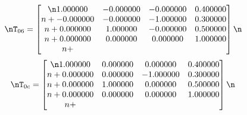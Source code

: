 \begin{equation*}\nT_{06} = \begin{bmatrix}\n1.000000 & -0.000000 & -0.000000 & 0.400000 \\n+-0.000000 & -0.000000 & -1.000000 & 0.300000 \\n+0.000000 & 1.000000 & -0.000000 & 0.500000 \\n+0.000000 & 0.000000 & 0.000000 & 1.000000 \\n+\end{bmatrix}\n\end{equation*}\n\n\begin{equation*}\nT_{0c} = \begin{bmatrix}\n1.000000 & 0.000000 & 0.000000 & 0.400000 \\n+0.000000 & 0.000000 & -1.000000 & 0.300000 \\n+0.000000 & 1.000000 & 0.000000 & 0.500000 \\n+0.000000 & 0.000000 & 0.000000 & 1.000000 \\n+\end{bmatrix}\n\end{equation*}\n